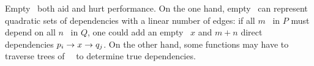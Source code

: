 Empty \patches\ both aid and hurt performance.
%
On the one hand, empty \patches\ can represent quadratic sets of dependencies
 with a linear number of edges: if all $m$ \patches\ in $P$ must depend on
 all $n$ \patches\ in $Q$, one could 
 add an empty \patch\ $x$ and $m+n$ direct dependencies
 $p_i \rightarrow x \rightarrow q_j$.
%
On the other hand, some functions may have to traverse trees of \noop\
 \chdescs\ to determine true dependencies.


\begin{comment}
To solve this problem, we introduce an additional type of \chdesc. The
prototypical \chdesc\ corresponds to some change on disk, but \Kudos\ also
supports \aemphnoop\ \chdesc\ type, which doesn't change the disk at all.
\Noop\ \chdescs\ can have \befores, like other \chdescs, but they don't need to
be written to disk: they are trivially satisfied when all of their \befores\ are
satisfied. Thus, they can be used to ``stand for'' entire sets of other changes.
%
This capability is extremely useful, and is used by most operations on disk
structures so that a single \chdesc\ can be returned that depends on the whole
change. Likewise, \anoop\ \chdesc\ can be passed in as a parameter to a disk
operation to make the whole operation depend on a set of other changes. \Noop\
\chdescs\ allow dependencies between sets with only a linear number of
dependency edges in the \chdesc\ graph, and without having to pass around arrays
of \chdescs.
%
The cost is that some functions may have to traverse trees of \noop\ \chdescs\
to determine true dependencies.
\end{comment}
